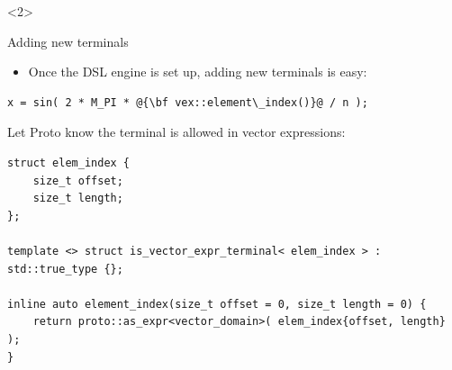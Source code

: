 \documentclass[@BEAMER_OPTIONS@]{beamer}
\begin{document}
\begin{frame}[fragile]
\begin{onlyenv}
    \end{onlyenv}
    \begin{onlyenv}<2>
    \end{onlyenv}
\end{frame}

\begin{frame}[fragile]{Adding new terminals}
    \begin{itemize}
        \item Once the DSL engine is set up, adding new terminals is easy:
    \end{itemize}
    \begin{exampleblock}{}
        \begin{lstlisting}[escapechar=@,numbers=none]
x = sin( 2 * M_PI * @{\bf vex::element\_index()}@ / n );
        \end{lstlisting}
    \end{exampleblock}
    \begin{exampleblock}{Let Proto know the terminal is allowed in vector
        expressions:}
        \begin{lstlisting}
struct elem_index {
    size_t offset;
    size_t length;
};

template <> struct is_vector_expr_terminal< elem_index > : std::true_type {};

inline auto element_index(size_t offset = 0, size_t length = 0) {
    return proto::as_expr<vector_domain>( elem_index{offset, length} );
}
        \end{lstlisting}
    \end{exampleblock}
\end{frame}
\end{document}
